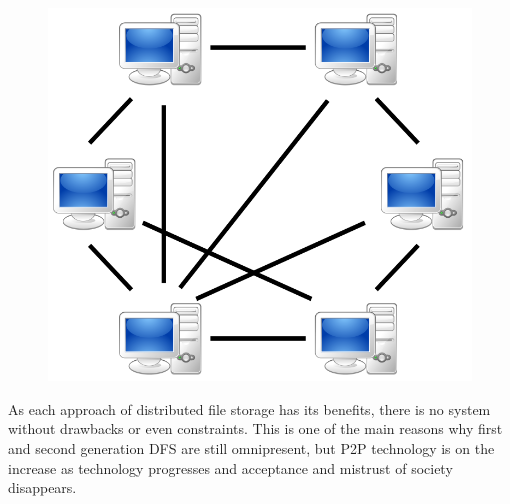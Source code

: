 \begin{figure}
\begin{minipage}{.33\textwidth}
		\label{2nd_gen_dfs}
	\end{minipage}
	\begin{minipage}{.33\textwidth}
		\centering
		\includegraphics[scale=0.175]{Talk5/3rd_gen_dfs.PNG}
		\label{3rd_gen_dfs}
	\end{minipage}
\end{figure}

As each approach of distributed file storage has its benefits, there is no system without drawbacks or even constraints. This is one of the main reasons why first and second generation DFS are still omnipresent, but P2P technology is on the increase as technology progresses and acceptance and mistrust of society disappears. %

